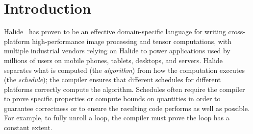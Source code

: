 \documentclass[acmsmall,review,anonymous]{acmart}\settopmatter{printfolios=true,printccs=false,printacmref=false}
\begin{document}




\maketitle


\section{Introduction}
%

Halide~\cite{ragankelley2012halide, ragankelley2013halide} has proven to be an
effective domain-specific language for writing cross-platform high-performance
image processing and tensor computations, with multiple industrial vendors
relying on Halide to power applications used by millions of users on mobile
phones, tablets, desktops, and servers. Halide separates what is computed (the
\textit{algorithm}) from how the computation executes (the \textit{schedule});
the compiler ensures that different schedules for different platforms correctly
compute the algorithm. Schedules often require the compiler to prove specific
properties or compute bounds on quantities in order to guarantee correctness or to ensure the resulting code
performs as well as possible.  For example, to fully unroll a loop, the compiler
must prove the loop has a constant extent.
\end{document}
